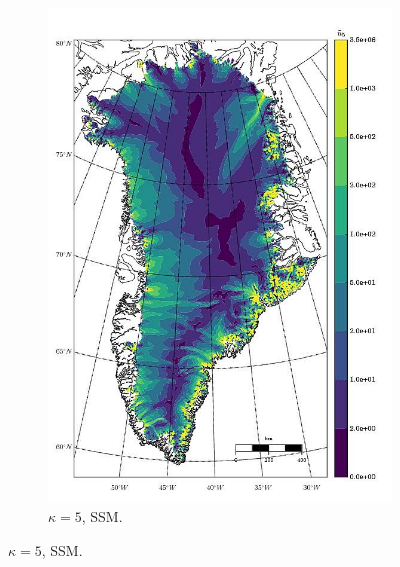 \begin{figure}
\begin{subfigure}[b]{0.25\linewidth}
    \includegraphics[width=\linewidth]{images/balance_velocity/greenland/d_U_ob/Ubar_5H_kappa_5_SSM.jpg}
  \caption{$\kappa = 5$, SSM.}
  \label{greenland_bv_image_d_U_ob_kappa_5_SSM}
  \end{subfigure}


\end{figure}
